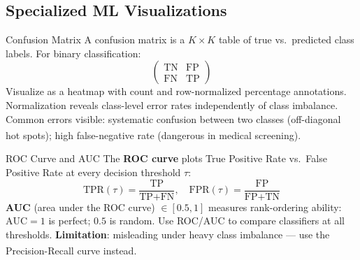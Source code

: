 \subsection{Specialized ML Visualizations}

\begin{v3topic}{Confusion Matrix}
    A confusion matrix is a $K \times K$ table of true vs.\ predicted class labels.
    For binary classification:
    \begin{equation}
        \begin{pmatrix} \text{TN} & \text{FP} \\ \text{FN} & \text{TP} \end{pmatrix}
    \end{equation}
    Visualize as a heatmap with count and row-normalized percentage annotations.
    Normalization reveals class-level error rates independently of class imbalance.
    Common errors visible: systematic confusion between two classes (off-diagonal hot
    spots); high false-negative rate (dangerous in medical
    screening)\textsuperscript{\cite[][pp.~180--185]{raschkaPythonMachineLearning2015}}.

\end{v3topic}
\begin{v3topic}{ROC Curve and AUC}
    The \textbf{ROC curve} plots True Positive Rate vs.\ False Positive Rate at every
    decision threshold $\tau$:
    \begin{equation}
        \text{TPR}(\tau) = \frac{\text{TP}}{\text{TP}+\text{FN}}, \quad
        \text{FPR}(\tau) = \frac{\text{FP}}{\text{FP}+\text{TN}}
    \end{equation}
    \textbf{AUC} (area under the ROC curve) $\in [0.5, 1]$ measures rank-ordering
    ability: $\text{AUC}=1$ is perfect; $0.5$ is random.
    Use ROC/AUC to compare classifiers at all thresholds.
    \textbf{Limitation}: misleading under heavy class imbalance --- use the
    Precision-Recall curve
    instead\textsuperscript{\cite[][pp.~185--190]{raschkaPythonMachineLearning2015}}.

\end{v3topic}
